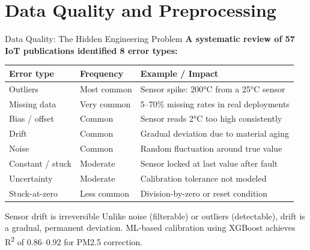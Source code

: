\documentclass[aspectratio=169,11pt]{beamer}
\begin{document}
\section{Data Quality and Preprocessing}

\begin{frame}{Data Quality: The Hidden Engineering Problem}
    \small
    \textbf{A systematic review of 57 IoT publications identified 8 error types:}

    \vspace{0.05cm}
    \begin{center}
    \scriptsize
    \begin{tabular}{p{3cm}p{3cm}p{5.5cm}}
        \toprule
        \textbf{Error type} & \textbf{Frequency} & \textbf{Example / Impact} \\
        \midrule
        Outliers & Most common & Sensor spike: 200°C from a 25°C sensor \\
        Missing data & Very common & 5--70\% missing rates in real deployments \\
        Bias / offset & Common & Sensor reads 2°C too high consistently \\
        Drift & Common & Gradual deviation due to material aging \\
        Noise & Common & Random fluctuation around true value \\
        Constant / stuck & Moderate & Sensor locked at last value after fault \\
        Uncertainty & Moderate & Calibration tolerance not modeled \\
        Stuck-at-zero & Less common & Division-by-zero or reset condition \\
        \bottomrule
    \end{tabular}
    \end{center}

    \begin{alertblock}{Sensor drift is irreversible}
        Unlike noise (filterable) or outliers (detectable), drift is a gradual, permanent deviation. ML-based calibration using XGBoost achieves R\textsuperscript{2} of 0.86--0.92 for PM2.5 correction.
    \end{alertblock}
\end{frame}
\end{document}
